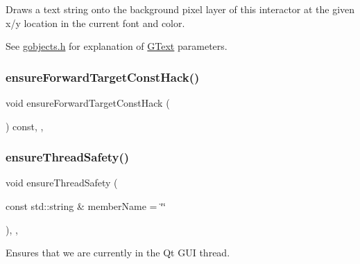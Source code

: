 Draws a text string onto the background pixel layer of this interactor at the given x/y location in the current font and color. 

See \mbox{\hyperlink{gobjects_8h_source}{gobjects.\+h}} for explanation of \mbox{\hyperlink{classGText}{G\+Text}} parameters. \mbox{\label{classGForwardDrawingSurface_a1b7188344977b67f01c452a6ba490992}} 
\subsubsection{\texorpdfstring{ensure\+Forward\+Target\+Const\+Hack()}{ensureForwardTargetConstHack()}}
{\footnotesize\ttfamily void ensure\+Forward\+Target\+Const\+Hack (\begin{DoxyParamCaption}{ }\end{DoxyParamCaption}) const\hspace{0.3cm}{\ttfamily [protected]}, {\ttfamily [virtual]}, {\ttfamily [inherited]}}

\mbox{\label{classGObservable_a284f31528c0520f8e545c03ac9eeac74}} 
\subsubsection{\texorpdfstring{ensure\+Thread\+Safety()}{ensureThreadSafety()}}
{\footnotesize\ttfamily void ensure\+Thread\+Safety (\begin{DoxyParamCaption}\item[{const std\+::string \&}]{member\+Name = {\ttfamily \char`\"{}\char`\"{}} }\end{DoxyParamCaption})\hspace{0.3cm}{\ttfamily [protected]}, {\ttfamily [virtual]}, {\ttfamily [inherited]}}



Ensures that we are currently in the Qt G\+UI thread. 

\mbox{\label{classGDrawingSurface_a228075ad18bd97b57f9956568c4773f3}} 
